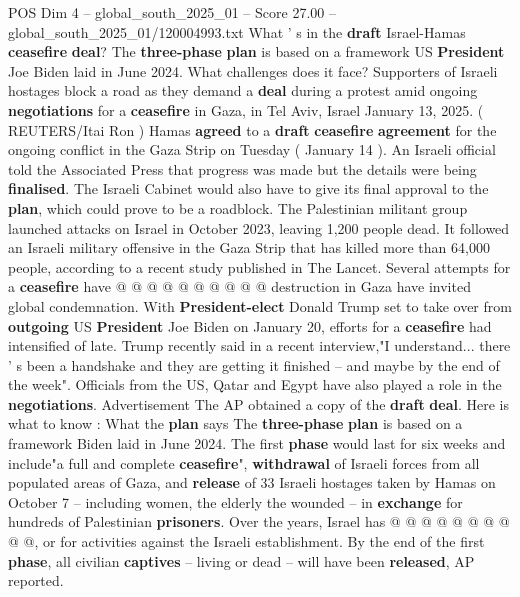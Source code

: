 \begin{textsample}{POS Dim 4 – global\_south\_2025\_01 – Score 27.00 – global\_south\_2025\_01/120004993.txt}  \label{ex:f4_pos_009}
What ' s in the \textbf{draft} Israel-Hamas \textbf{ceasefire} \textbf{deal}?
The \textbf{three-phase} \textbf{plan} is based on a framework US \textbf{President} Joe Biden laid in June 2024.
What challenges does it face?
Supporters of Israeli hostages block a road as they demand a \textbf{deal} during a protest amid ongoing \textbf{negotiations} for a \textbf{ceasefire} in Gaza, in Tel Aviv, Israel January 13, 2025. ( REUTERS/Itai Ron ) Hamas \textbf{agreed} to a \textbf{draft} \textbf{ceasefire} \textbf{agreement} for the ongoing conflict in the Gaza Strip on Tuesday ( January 14 ).
An Israeli official told the Associated Press that progress was made but the details were being \textbf{finalised}.
The Israeli Cabinet would also have to give its final approval to the \textbf{plan}, which could prove to be a roadblock.
The Palestinian militant group launched attacks on Israel in October 2023, leaving 1,200 people dead.
It followed an Israeli military offensive in the Gaza Strip that has killed more than 64,000 people, according to a recent study published in The Lancet.
Several attempts for a \textbf{ceasefire} have @ @ @ @ @ @ @ @ @ @ destruction in Gaza have invited global condemnation.
With \textbf{President-elect} Donald Trump set to take over from \textbf{outgoing} US \textbf{President} Joe Biden on January 20, efforts for a \textbf{ceasefire} had intensified of late.
Trump recently said in a recent interview,"I understand... there ' s been a handshake and they are getting it finished -- and maybe by the end of the week".
Officials from the US, Qatar and Egypt have also played a role in the \textbf{negotiations}.
Advertisement The AP obtained a copy of the \textbf{draft} \textbf{deal}.
Here is what to know : What the \textbf{plan} says The \textbf{three-phase} \textbf{plan} is based on a framework Biden laid in June 2024.
The first \textbf{phase} would last for six weeks and include"a full and complete \textbf{ceasefire}", \textbf{withdrawal} of Israeli forces from all populated areas of Gaza, and \textbf{release} of 33 Israeli hostages taken by Hamas on October 7 -- including women, the elderly the wounded -- in \textbf{exchange} for hundreds of Palestinian \textbf{prisoners}.
Over the years, Israel has @ @ @ @ @ @ @ @ @ @, or for activities against the Israeli establishment.
By the end of the first \textbf{phase}, all civilian \textbf{captives} -- living or dead -- will have been \textbf{released}, AP reported.

\end{textsample}
